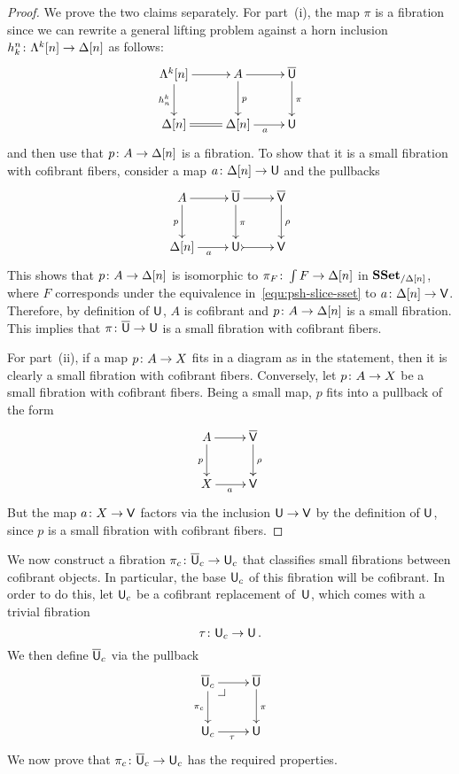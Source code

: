 \documentclass[reqno,10pt,a4paper,oneside,draft]{amsart}
\begin{document}
\begin{proof} We prove the two claims separately.
For part~(i),  the map $\pi$ is a fibration since we can rewrite a general lifting problem against a horn inclusion $h^n_k \colon \Lambda^k[n] \rightarrow \Delta[n]$ as follows:
\[
\xymatrix{
\Lambda^k[n] \ar[r] \ar[d]_{h^k_n} & A  \ar[d]^{p} \ar[r] & \UU \ar[d]^\pi \\
\Delta[n] \ar@{=}[r]  & \Delta[n] \ar[r]_a & \U  }
\]
and then use that $p \colon A  \to \Delta[n]$ is a fibration. To show that it is a small fibration with
cofibrant fibers, consider a map $a \colon \Delta[n] \rightarrow \mathsf{U}$ and the pullbacks
\[
\xymatrix{
A \ar[r] \ar[d]_p  & \UU \ar[d]^{\pi} \ar[r]  & \VV \ar[d]^{\rho} \\
\Delta[n] \ar[r]_{a} & \U \ar@{>->}[r] & \V }
\]
This shows that $p \colon A \rightarrow \Delta[n]$ is isomorphic to $\pi_F \colon \int F \rightarrow \Delta[n]$ in $\mathbf{SSet}_{/ \Delta[n]}$, where $F$ corresponds under the equivalence in~\eqref{equ:psh-slice-sset} to 
$a \colon \Delta[n] \rightarrow \mathsf{V}$. Therefore, by definition of $\mathsf{U}$, $A$ is cofibrant and $p \colon A \rightarrow \Delta[n]$ is a small fibration. This implies that $\pi \colon \overline{\mathsf{U}} \rightarrow \mathsf{U}$ is a small fibration with cofibrant
fibers. 

For part~(ii), if a map $p \colon A \to X$ fits in a diagram as in the statement, then it is clearly a small fibration with
cofibrant fibers. Conversely, let $p \colon A \to X$ be a small fibration with cofibrant fibers. Being a small 
map, $p$ fits into a pullback of the form 
\[
\xymatrix{
A \ar[r] \ar[d]_p  &  \VV \ar[d]^{\rho} \\
X \ar[r]_{a} & \V }
\]
But the map $a \colon X \rightarrow \mathsf{V}$ factors via the inclusion $\mathsf{U} \to \mathsf{V}$ by the definition of
$\mathsf{U}$, since $p$ is a small fibration with cofibrant fibers.   \qedhere
\end{proof} 



\bigskip

We now  construct a fibration $\pi_c \colon \overline{\mathsf{U}}_c \to \mathsf{U}_c$ that classifies small fibrations between 
cofibrant objects. In particular, the base $\mathsf{U}_c$ of this fibration will be cofibrant.  In order to do this, let $\mathsf{U}_c$ be a cofibrant replacement of~$\mathsf{U}$,  which comes with a trivial fibration
\begin{equation}
\label{equ:ucu}
\tau \colon \mathsf{U}_c \rightarrow \mathsf{U} \, .
\end{equation}
We then define $\overline{\mathsf{U}}_c$ via the pullback
\[
\xymatrix{
\UU_c \ar[d]_{\pi_c} \ar[r] \drpullback & \UU \ar[d]^{\pi}  \\
\U_c \ar[r]_\tau & \U}
\]
We now prove that $\pi_c \colon \overline{\mathsf{U}}_c \to \mathsf{U}_c$ has the required properties.
\end{document}

